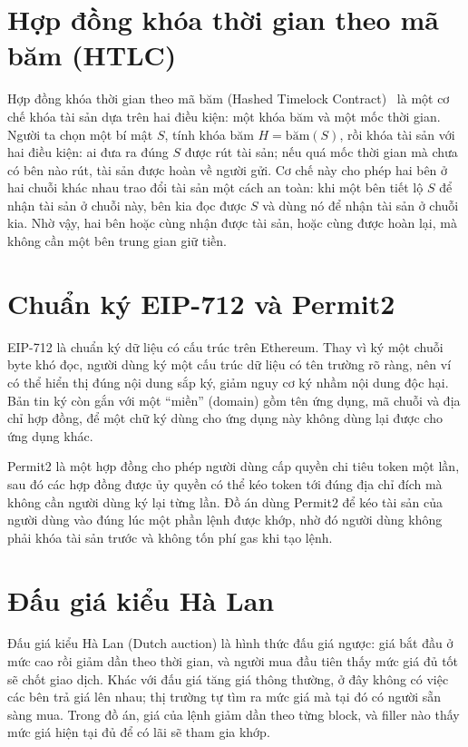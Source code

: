 \documentclass[../DoAn.tex]{subfiles}
\begin{document}
\section{Hợp đồng khóa thời gian theo mã băm (HTLC)}
\label{apdx:htlc}

Hợp đồng khóa thời gian theo mã băm (Hashed Timelock Contract)~\cite{herlihy2018atomic} là một cơ chế khóa tài sản dựa trên hai điều kiện: một khóa băm và một mốc thời gian. Người ta chọn một bí mật $S$, tính khóa băm $H = \text{băm}(S)$, rồi khóa tài sản với hai điều kiện: ai đưa ra đúng $S$ được rút tài sản; nếu quá mốc thời gian mà chưa có bên nào rút, tài sản được hoàn về người gửi. Cơ chế này cho phép hai bên ở hai chuỗi khác nhau trao đổi tài sản một cách an toàn: khi một bên tiết lộ $S$ để nhận tài sản ở chuỗi này, bên kia đọc được $S$ và dùng nó để nhận tài sản ở chuỗi kia. Nhờ vậy, hai bên hoặc cùng nhận được tài sản, hoặc cùng được hoàn lại, mà không cần một bên trung gian giữ tiền.

\section{Chuẩn ký EIP-712 và Permit2}
\label{apdx:eip712}

EIP-712 là chuẩn ký dữ liệu có cấu trúc trên Ethereum. Thay vì ký một chuỗi byte khó đọc, người dùng ký một cấu trúc dữ liệu có tên trường rõ ràng, nên ví có thể hiển thị đúng nội dung sắp ký, giảm nguy cơ ký nhầm nội dung độc hại. Bản tin ký còn gắn với một ``miền'' (domain) gồm tên ứng dụng, mã chuỗi và địa chỉ hợp đồng, để một chữ ký dùng cho ứng dụng này không dùng lại được cho ứng dụng khác.

Permit2 là một hợp đồng cho phép người dùng cấp quyền chi tiêu token một lần, sau đó các hợp đồng được ủy quyền có thể kéo token tới đúng địa chỉ đích mà không cần người dùng ký lại từng lần. Đồ án dùng Permit2 để kéo tài sản của người dùng vào đúng lúc một phần lệnh được khớp, nhờ đó người dùng không phải khóa tài sản trước và không tốn phí gas khi tạo lệnh.

\section{Đấu giá kiểu Hà Lan}
\label{apdx:dutch}

Đấu giá kiểu Hà Lan (Dutch auction) là hình thức đấu giá ngược: giá bắt đầu ở mức cao rồi giảm dần theo thời gian, và người mua đầu tiên thấy mức giá đủ tốt sẽ chốt giao dịch. Khác với đấu giá tăng giá thông thường, ở đây không có việc các bên trả giá lên nhau; thị trường tự tìm ra mức giá mà tại đó có người sẵn sàng mua. Trong đồ án, giá của lệnh giảm dần theo từng block, và filler nào thấy mức giá hiện tại đủ để có lãi sẽ tham gia khớp.
\end{document}

